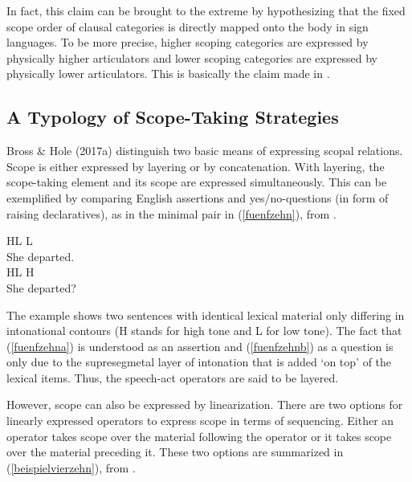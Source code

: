 In fact, this claim can be brought to the extreme by hypothesizing that the fixed scope order of clausal categories is directly mapped onto the body in sign languages. To be more precise, higher scoping categories are expressed by physically higher articulators and lower scoping categories are expressed by physically lower articulators. This is basically the claim made in \citet{bross2017scope}.

\subsection{A Typology of Scope-Taking Strategies}
Bross \& Hole (2017a) distinguish two basic means of expressing scopal relations. Scope is either expressed by layering or by concatenation. With layering, the scope-taking element and its scope are expressed simultaneously. This can be exemplified by comparing English assertions and yes/no-questions (in form of raising declaratives), as in the minimal pair in (\ref{fuenfzehn}), from \citet{bross2017scope}.

\begin{exe} 
\ex \label{fuenfzehn}
\begin{xlist} 
\ex 
\gll {} {\hspace{12pt} HL L} \\
She departed. \\ \label{fuenfzehna}
\ex 
\gll {} {\hspace{12pt} HL H} \\
She departed? \\ \label{fuenfzehnb} 
\end{xlist} 
\end{exe}

\noindent The example shows two sentences with identical lexical material only differing in intonational contours (H stands for high tone and L for low tone). The fact that (\ref{fuenfzehna}) is understood as an assertion and (\ref{fuenfzehnb}) as a question is only due to the supresegmetal layer of intonation that is added `on top' of the lexical items. Thus, the speech-act operators are said to be layered. 

However, scope can also be expressed by linearization. There are two options for linearly expressed operators to express scope in terms of sequencing. Either an operator takes scope over the material following the operator or it takes scope over the material preceding it. These two options are summarized in (\ref{beispielvierzehn}), from \citet{bross2017scope}.

